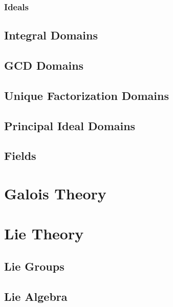 \documentclass[12pt, english]{book}
\begin{document}
	\section{Ideals} \label{Ideals Section - Abstract Algebra}
	
	\chapter{Integral Domains} \label{Integral Domains Chapter - Abstract Algebra}
	
	\chapter{GCD Domains} \label{GCD Domains Chapter - Abstract Algebra}
	
	\chapter{Unique Factorization Domains} \label{Unique Factorization Domains Chapter - Abstract Algebra}
	
	\chapter{Principal Ideal Domains} \label{Principal Ideal Domains Chapter - Abstract Algebra}
	
	\chapter{Fields} \label{Fields Chapter - Abstract Algebra}
	
	
	\part{Galois Theory} \label{Galois Theory Part}
	
	\part{Lie Theory} \label{Lie Algebra Part}
	
	\chapter{Lie Groups}
	
	\chapter{Lie Algebra}
	
\end{document}
